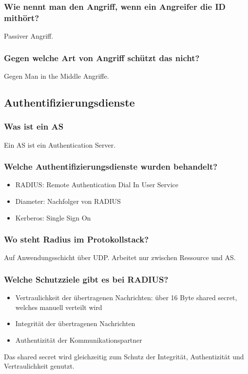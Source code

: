 	\subsubsection{Wie nennt man den Angriff, wenn ein Angreifer die ID mithört?}
	Passiver Angriff.
	
	\subsubsection{Gegen welche Art von Angriff schützt das nicht?}
	Gegen Man in the Middle Angriffe.
	
	
	\subsection{Authentifizierungsdienste}
	
	\subsubsection{Was ist ein AS}
	Ein AS ist ein Authentication Server. 
	
	\subsubsection{Welche Authentifizierungsdienste wurden behandelt?}
	\begin{itemize}
		\item RADIUS: Remote Authentication Dial In User Service
		\item Diameter: Nachfolger von RADIUS
		\item Kerberos: Single Sign On
	\end{itemize}
	
	\subsubsection{Wo steht Radius im Protokollstack?}
	Auf Anwendungsschicht über UDP. Arbeitet nur zwischen Ressource und AS.
	
	\subsubsection{Welche Schutzziele gibt es bei RADIUS?}
	\begin{itemize}
		\item Vertraulichkeit der übertragenen Nachrichten: über 16 Byte shared secret, welches manuell verteilt wird
		\item Integrität der übertragenen Nachrichten
		\item Authentizität der Kommunikationspartner
	\end{itemize}
	Das shared secret wird gleichzeitig zum Schutz der Integrität, Authentizität und Vertraulichkeit genutzt.
	

